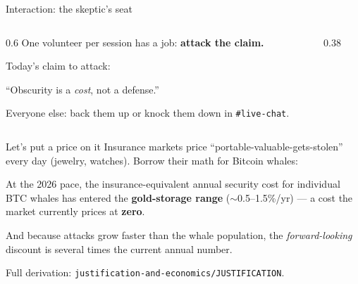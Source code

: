 \documentclass[aspectratio=169,11pt]{beamer}
\begin{document}
\begin{frame}{Interaction: the skeptic's seat}
  \begin{columns}[T]
    \begin{column}{0.6\textwidth}
      One volunteer per session has a job: \textbf{attack the claim.}
      \vspace{6pt}

      Today's claim to attack:
      \begin{block}{}
        ``Obscurity is a \emph{cost}, not a defense.''
      \end{block}
      \vspace{6pt}
      Everyone else: back them up or knock them down in \texttt{\#live-chat}.
    \end{column}
    \begin{column}{0.38\textwidth}
    \end{column}
  \end{columns}
\end{frame}

\begin{frame}{Let's put a price on it}
  Insurance markets price ``portable-valuable-gets-stolen'' every day (jewelry,
  watches). Borrow their math for Bitcoin whales:
  \begin{keyidea}
    At the 2026 pace, the insurance-equivalent annual security cost for individual
    BTC whales has entered the \textbf{gold-storage range} ($\sim$0.5--1.5\%/yr) ---
    a cost the market currently prices at \textbf{zero}.
  \end{keyidea}
  And because attacks grow faster than the whale population, the
  \emph{forward-looking} discount is several times the current annual number.
  \begin{center}\footnotesize\color{graytext}
  Full derivation: \texttt{justification-and-economics/JUSTIFICATION}.
  \end{center}
\end{frame}
\end{document}
